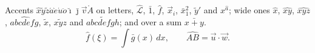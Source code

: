 \documentclass{article}
\begin{document}
Accents $\hat{x}\check{y}\tilde{z}\acute{a}\grave{e}\dot{u}\ddot{o}\breve{\imath}\bar{\jmath}\vec{v}\mathring{A}$ on
letters, $\hat{\mathcal{L}}$, $\bar{1}$, $\hat{f}$, $\vec{x}_{i}$, $\bar{x}^{2}_{1}$, $\tilde{y}'$ and $x^{\hat{a}}$; wide ones
$\widehat{x}$, $\widehat{xy}$, $\widehat{xyz}$, $\widehat{abcdefg}$, $\widetilde{x}$, $\widetilde{xyz}$ and $\widetilde{abcdefgh}$;
and over a sum $\bar{x+y}$.
\[ \hat{f}(\xi) = \int \bar{g}(x)\, dx, \qquad \widehat{AB} = \vec{u}\cdot\vec{w}. \]
\end{document}

